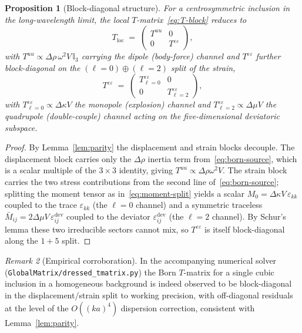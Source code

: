 \documentclass[11pt,a4paper]{article}
\newcommand{\eps}{\varepsilon}
\newcommand{\dev}{\mathrm{dev}}
\theoremstyle{plain}
\newtheorem{proposition}{Proposition}
\theoremstyle{definition}
\theoremstyle{remark}
\newtheorem{remark}[proposition]{Remark}
\begin{document}
\begin{proposition}[Block-diagonal structure]\label{prop:blockdiag}
For a centrosymmetric inclusion in the long-wavelength limit, the
local $T$-matrix~\eqref{eq:T-block} reduces to
\begin{equation}
  T_{\text{loc}}
  \;=\;
  \begin{pmatrix}
    T^{uu} & 0\\
    0      & T^{\eps\eps}
  \end{pmatrix},
\end{equation}
with $T^{uu}\propto\Delta\rho\,\omega^2 V\,\mathbb{I}_{3}$ carrying the
dipole (body-force) channel and
$T^{\eps\eps}$ further block-diagonal on the
$(\ell=0)\oplus(\ell=2)$ split of the strain,
\begin{equation}
  T^{\eps\eps}
  \;=\;
  \begin{pmatrix}
    T^{\eps\eps}_{\ell=0} & 0\\
    0 & T^{\eps\eps}_{\ell=2}
  \end{pmatrix},
\end{equation}
with $T^{\eps\eps}_{\ell=0}\propto\Delta\kappa V$ the monopole
(explosion) channel and
$T^{\eps\eps}_{\ell=2}\propto\Delta\mu V$ the quadrupole
(double-couple) channel acting on the five-dimensional deviatoric
subspace.
\end{proposition}

\begin{proof}
By Lemma~\ref{lem:parity} the displacement and strain blocks decouple.
The displacement block carries only the $\Delta\rho$ inertia term
from~\eqref{eq:born-source}, which is a scalar multiple of the
$3\times 3$ identity, giving $T^{uu}\propto\Delta\rho\omega^2 V$.
The strain block carries the two stress contributions from the second
line of~\eqref{eq:born-source}; splitting
the moment tensor as in~\eqref{eq:moment-split} yields a scalar
$M_0=\Delta\kappa V\,\eps_{kk}$ coupled to the trace
$\eps_{kk}$ (the $\ell=0$ channel) and a symmetric traceless
$\bar{M}_{ij}=2\Delta\mu V\,\eps_{ij}^{\dev}$ coupled to the deviator
$\eps_{ij}^{\dev}$ (the $\ell=2$ channel).
By Schur's lemma these two irreducible sectors cannot mix, so
$T^{\eps\eps}$ is itself block-diagonal along the $1+5$ split.
\end{proof}

\begin{remark}[Empirical corroboration]
In the accompanying numerical solver
(\texttt{GlobalMatrix/dressed\_tmatrix.py}) the Born $T$-matrix for a
single cubic inclusion in a homogeneous background is indeed observed
to be block-diagonal in the displacement/strain split to working
precision, with off-diagonal residuals at the level of the $O((ka)^4)$
dispersion correction, consistent with Lemma~\ref{lem:parity}.
\end{remark}
\end{document}
